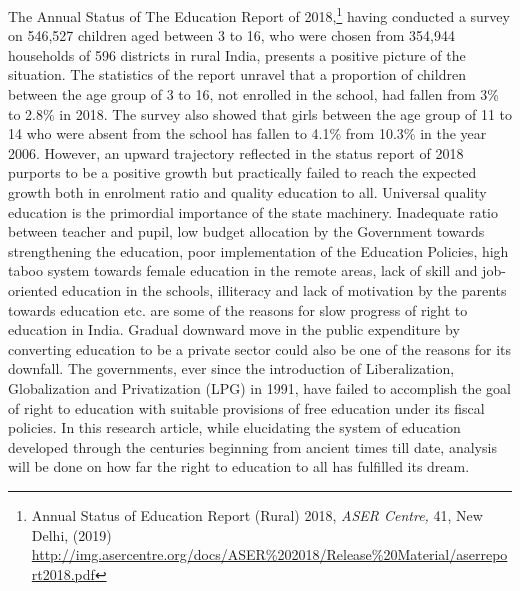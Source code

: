 \setcounter{figure}{0}
\setcounter{table}{0}
\setcounter{footnote}{0}


\begin{multicols}{2}


\noi
The Annual Status of The Education Report of 2018,\footnote{Annual Status of Education Report (Rural) 2018, \textit{ASER Centre,} 41, New Delhi, (2019) \url{http://img.asercentre.org/docs/ASER\%202018/Release\%20Material/aserreport2018.pdf}} having conducted a survey on 546,527 children aged between 3 to 16, who were chosen from 354,944 households of 596 districts in
rural India, presents a positive picture of the situation. The statistics of the report unravel that
a proportion of children between the age group of 3 to 16, not enrolled in the school, had
fallen from 3\% to 2.8\% in 2018. The survey also showed that girls between the age group of
11 to 14 who were absent from the school has fallen to 4.1\% from 10.3\% in the year 2006.
However, an upward trajectory reflected in the status report of 2018 purports to be a positive
growth but practically failed to reach the expected growth both in enrolment ratio and quality
education to all. Universal quality education is the primordial importance of the state
machinery. Inadequate ratio between teacher and pupil, low budget allocation by the
Government towards strengthening the education, poor implementation of the Education
Policies, high taboo system towards female education in the remote areas, lack of skill and
job-oriented education in the schools, illiteracy and lack of motivation by the parents towards
education etc. are some of the reasons for slow progress of right to education in India.
Gradual downward move in the public expenditure by converting education to be a private
sector could also be one of the reasons for its downfall. The governments, ever since the
introduction of Liberalization, Globalization and Privatization (LPG) in 1991, have failed to
accomplish the goal of right to education with suitable provisions of free education under its
fiscal policies. In this research article, while elucidating the system of education developed
through the centuries beginning from ancient times till date, analysis will be done on how far
the right to education to all has fulfilled its dream.


\end{multicols}
